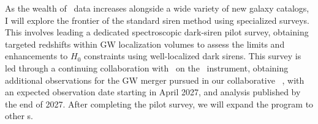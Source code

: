 As the wealth of \GW\ data increases alongside a wide variety of new galaxy catalogs, I will explore the frontier of the standard siren method using specialized surveys.
This involves leading a dedicated spectroscopic dark-siren pilot survey, obtaining targeted redshifts within GW localization volumes to assess the limits and enhancements to $H_0$ constraints using well-localized dark sirens. This survey is led through a continuing collaboration with \JGEM\ on the \PFS\ instrument, obtaining additional observations for the GW merger pursued in our collaborative \DESGW\ \ToO, with an expected observation date starting in April 2027, and analysis published by the end of 2027. After completing the pilot survey, we will expand the program to other \GW s.


